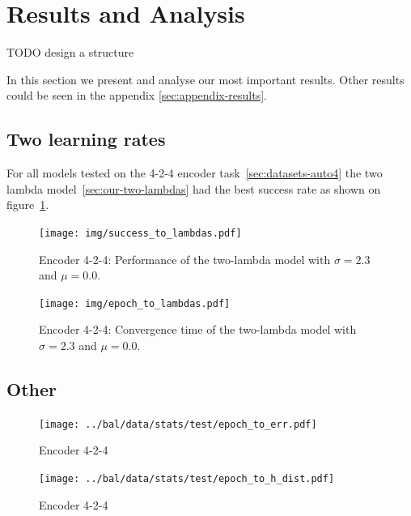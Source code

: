
\section{Results and Analysis} 
\label{sec:results} 

TODO design a structure 

In this section we present and analyse our most important results. Other results could be seen in the appendix \ref{sec:appendix-results}. 

\subsection{Two learning rates} 
\label{sec:results-two-lambdas} 

For all models tested on the 4-2-4 encoder task~\ref{sec:datasets-auto4} the two lambda model~\ref{sec:our-two-lambdas} had the best success rate as shown on figure~\ref{fig:results-two-lambdas-auto4-success}. 

\begin{figure}[t]
  \centering
  \texttt{[image: img/success\_to\_lambdas.pdf]}    
  \caption{Encoder 4-2-4: Performance of the two-lambda model with $\sigma = 2.3$ and $\mu = 0.0$.}
  \label{fig:results-two-lambdas-auto4-success}
\end{figure}
\begin{figure}[t]
  \centering
  \texttt{[image: img/epoch\_to\_lambdas.pdf]}    
  \caption{Encoder 4-2-4: Convergence time of the two-lambda model with $\sigma = 2.3$ and $\mu = 0.0$.}
  \label{fig:results-two-lambdas-auto4-epoch}
\end{figure}

\subsection{Other} 
\begin{figure}[t]
  \centering
  \texttt{[image: ../bal/data/stats/test/epoch\_to\_err.pdf]}    
  \caption{Encoder 4-2-4}
  \label{fig:TODO-1}
\end{figure}


\begin{figure}[t]
  \centering
  \texttt{[image: ../bal/data/stats/test/epoch\_to\_h\_dist.pdf]}    
  \caption{Encoder 4-2-4}
  \label{fig:TODO-2}
\end{figure}

